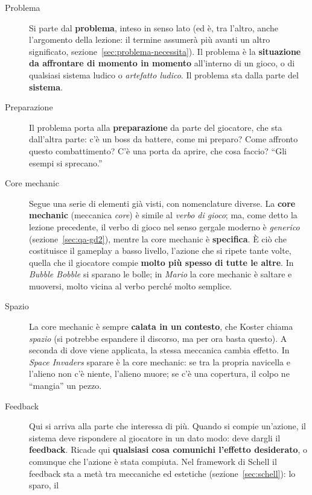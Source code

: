 \begin{description}
  \item[Problema] Si parte dal \textbf{problema}, inteso in senso lato (ed è,
        tra l'altro, anche l'argomento della lezione: il termine assumerà più
        avanti un altro significato, sezione~\ref{sec:problema-necessita}).
        Il problema è la \textbf{situazione da affrontare di momento in
        momento} all'interno di un gioco, o di qualsiasi sistema ludico o
        \emph{artefatto ludico}. Il problema sta dalla parte del
        \textbf{sistema}.
  \item[Preparazione] Il problema porta alla \textbf{preparazione} da parte
        del giocatore, che sta dall'altra parte: c'è un boss da battere, come
        mi preparo? Come affronto questo combattimento? C'è una porta da
        aprire, che cosa faccio? ``Gli esempi si sprecano.''
  \item[Core mechanic] Segue una serie di elementi già visti, con
        nomenclature diverse. La \textbf{core mechanic} (meccanica
        \emph{core}) è simile al \emph{verbo di gioco}; ma, come detto la
        lezione precedente, il verbo di gioco nel senso gergale moderno è
        \emph{generico} (sezione~\ref{sec:qa-gd2}), mentre la core mechanic è
        \textbf{specifica}. È ciò che costituisce il gameplay a basso
        livello, l'azione che si ripete tante volte, quella che il giocatore
        compie \textbf{molto più spesso di tutte le altre}. In \emph{Bubble
        Bobble} si sparano le bolle; in \emph{Mario} la core mechanic è
        saltare e muoversi, molto vicina al verbo perché molto semplice.
  \item[Spazio] La core mechanic è sempre \textbf{calata in un contesto}, che
        Koster chiama \emph{spazio} (si potrebbe espandere il discorso, ma per
        ora basta questo). A seconda di dove viene applicata, la stessa
        meccanica cambia effetto. In \emph{Space Invaders} sparare è la core
        mechanic: se tra la propria navicella e l'alieno non c'è niente,
        l'alieno muore; se c'è una copertura, il colpo ne ``mangia'' un pezzo.
  \item[Feedback] Qui si arriva alla parte che interessa di più. Quando si
        compie un'azione, il sistema deve rispondere al giocatore in un dato
        modo: deve dargli il \textbf{feedback}. Ricade qui \textbf{qualsiasi
        cosa comunichi l'effetto desiderato}, o comunque che l'azione è stata
        compiuta. Nel framework di Schell il feedback sta a metà tra
        meccaniche ed estetiche (sezione~\ref{sec:schell}): lo sparo, il

\end{description}

